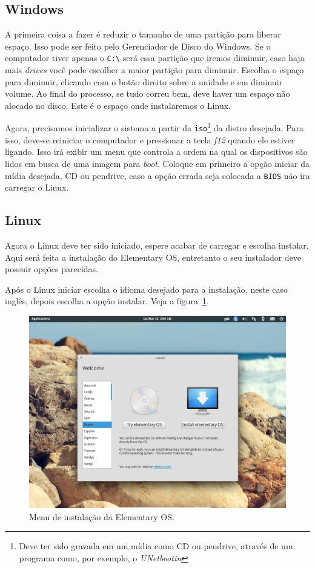 \documentclass{handout_utfpr}
\begin{document}
\subsection{Windows}
A primeira coisa a fazer é reduzir o tamanho de uma partição para liberar espaço. Isso pode ser feito pelo Gerenciador de Disco do Windows. Se o computador tiver apenas o \texttt{C:\textbackslash} será essa partição que iremos diminuir, caso haja mais \emph{drives} você pode escolher a maior partição para diminuir. Escolha o espaço para diminuir, clicando com o botão direito sobre a unidade e em diminuir volume. Ao final do processo, se tudo correu bem, deve haver um espaço não alocado no disco. Este é o espaço onde instalaremos o Linux.

Agora, precisamos inicializar o sistema a partir da \texttt{iso}\footnote{Deve ter sido gravada em um mídia como CD ou pendrive, através de um programa como, por exemplo, o \emph{UNetbootin}} da distro desejada. Para isso, deve-se reiniciar o computador e pressionar a tecla \emph{f12} quando ele estiver ligando. Isso irá exibir um menu que controla a ordem na qual os dispositivos são lidos em busca de uma imagem para \textit{boot}. Coloque em primeiro a opção iniciar da mídia desejada, CD ou pendrive, caso a opção errada seja colocada a \texttt{BIOS} não ira carregar o Linux.

\subsection{Linux}
Agora o Linux deve ter sido iniciado, espere acabar de carregar e escolha instalar. Aqui será feita a instalação do Elementary OS, entretanto o seu instalador deve possuir opções parecidas.

Após o Linux iniciar escolha o idioma desejado para a instalação, neste caso inglês, depois escolha a opção instalar. Veja a figura~\ref{fig:elementary-menu}.

\begin{figure}[h]
  \centering
  \includegraphics[scale=.4]{imagens/elementary-install-01.png}
  \caption{Menu de instalação da Elementary OS\@.}
  \label{fig:elementary-menu}
\end{figure}
\end{document}
